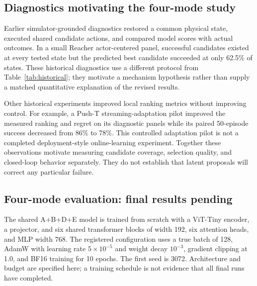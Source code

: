 \subsection{Diagnostics motivating the four-mode study}

Earlier simulator-grounded diagnostics restored a common physical state, executed shared candidate actions, and compared model scores with actual outcomes. In a small Reacher actor-centered panel, successful candidates existed at every tested state but the predicted best candidate succeeded at only 62.5\% of states. These historical diagnostics use a different protocol from Table~\ref{tab:historical}; they motivate a mechanism hypothesis rather than supply a matched quantitative explanation of the revised results.

Other historical experiments improved local ranking metrics without improving control. For example, a Push-T streaming-adaptation pilot improved the measured ranking and regret on its diagnostic panels while its paired 50-episode success decreased from 86\% to 78\%. This controlled adaptation pilot is not a completed deployment-style online-learning experiment.
Together these observations motivate measuring candidate coverage, selection quality, and closed-loop behavior separately. They do not establish that latent proposals will correct any particular failure.

\subsection{Four-mode evaluation: final results pending}

The shared A+B+D+E model is trained from scratch with a ViT-Tiny encoder, a projector, and six shared transformer blocks of width 192, six attention heads, and MLP width 768. The registered configuration uses a true batch of 128, AdamW with learning rate $5\times10^{-5}$ and weight decay $10^{-3}$, gradient clipping at 1.0, and BF16 training for 10 epochs. The first seed is 3072. Architecture and budget are specified here; a training schedule is not evidence that all final runs have completed.

